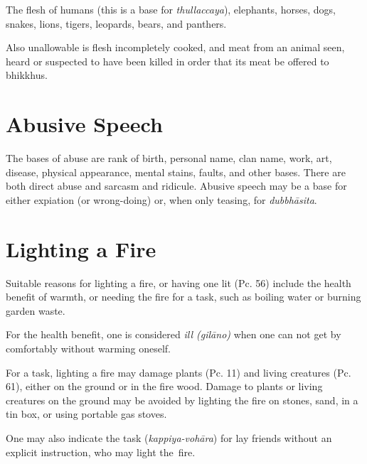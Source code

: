 The flesh of humans (this is a base for \emph{thullaccaya}), elephants, horses,
dogs, snakes, lions, tigers, leopards, bears, and panthers.\\
\mbox{}

Also unallowable is flesh incompletely cooked, and meat from an animal seen,
heard or suspected to have been killed in order that its meat be offered to
bhikkhus.\\
\mbox{}

\section*{Abusive Speech}

The bases of abuse are rank of birth, personal name, clan name, work, art,
disease, physical appearance, mental stains, faults, and other bases. There are
both direct abuse and sarcasm and ridicule. Abusive speech may be a base for
either expiation (or wrong-doing) or, when only teasing, for \emph{dubbhāsita}.


\section*{Lighting a Fire}

Suitable reasons for lighting a fire, or having one lit (Pc. 56) include the
health benefit of warmth, or needing the fire for a task, such as boiling water
or burning garden waste.

For the health benefit, one is considered \emph{ill (gilāno)} when one can not get by
comfortably without warming oneself.

For a task, lighting a fire may damage plants (Pc. 11) and living creatures (Pc.
61), either on the ground or in the fire wood. Damage to plants or living
creatures on the ground may be avoided by lighting the fire on stones, sand, in
a tin box, or using portable gas stoves.

One may also indicate the task (\emph{kappiya-vohāra}) for lay friends without
an explicit instruction, who may light the~fire.

